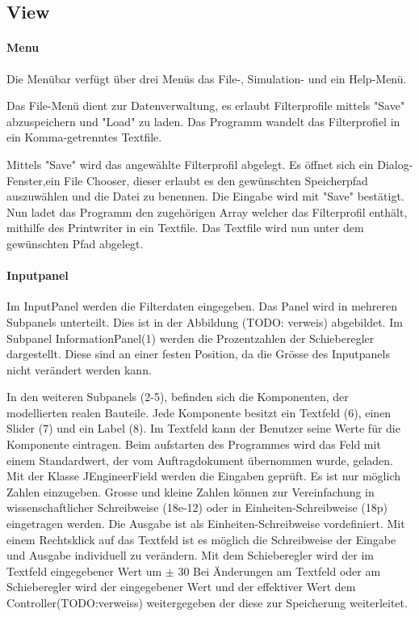 \subsection{View} \label{subsec:view}

\paragraph{Menu} \label{par:menu}

Die Menübar verfügt über drei Menüs das File-,  Simulation- und ein Help-Menü.

Das File-Menü dient zur Datenverwaltung, es erlaubt Filterprofile mittels "Save" abzuspeichern und "Load" zu laden. 
Das Programm wandelt das Filterprofiel in ein Komma-getrenntes Textfile.

Mittels "Save" wird das angewählte Filterprofil abgelegt. Es öffnet sich ein Dialog-Fenster,ein File Chooser, dieser erlaubt es den gewünschten Speicherpfad auszuwählen und die Datei zu benennen. Die Eingabe wird mit "Save" bestätigt. Nun ladet das Programm den zugehörigen Array welcher das Filterprofil enthält, mithilfe des Printwriter in ein Textfile. Das Textfile wird nun unter dem gewünschten Pfad abgelegt. 

\paragraph{Inputpanel} \label{par:inputpanel}


Im InputPanel werden die Filterdaten eingegeben. Das Panel wird in mehreren Subpanels unterteilt. Dies ist in der Abbildung (TODO: verweis) abgebildet. Im Subpanel InformationPanel(1) werden die Prozentzahlen der Schieberegler dargestellt. Diese sind an einer festen Position, da die Grösse des Inputpanels nicht verändert werden kann. 


In den weiteren Subpanels (2-5), befinden sich die Komponenten, der modellierten realen Bauteile. Jede Komponente besitzt ein Textfeld (6), einen Slider (7) und ein Label (8). 
Im Textfeld kann der Benutzer seine Werte für die Komponente eintragen. Beim aufstarten des Programmes wird das Feld mit einem Standardwert, der vom Auftragdokument übernommen wurde, geladen. Mit der Klasse JEngineerField werden die Eingaben geprüft. Es ist nur möglich Zahlen einzugeben. Grosse und kleine Zahlen können zur Vereinfachung in wissenschaftlicher Schreibweise (18e-12) oder in Einheiten-Schreibweise (18p) eingetragen werden. Die Ausgabe ist als Einheiten-Schreibweise vordefiniert. Mit einem Rechtsklick auf das Textfeld ist es möglich die Schreibweise der Eingabe und Ausgabe individuell zu verändern.
Mit dem Schieberegler wird der im Textfeld eingegebener Wert um $\pm$ 30%
Bei Änderungen am Textfeld oder am Schieberegler wird der eingegebener Wert und der effektiver Wert dem Controller(TODO:verweiss) weitergegeben der diese zur Speicherung weiterleitet.



